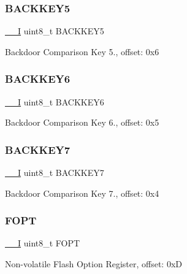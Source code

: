 \subsubsection{\texorpdfstring{BACKKEY5}{BACKKEY5}}
{\footnotesize\ttfamily \mbox{\hyperlink{core__cm0plus_8h_af63697ed9952cc71e1225efe205f6cd3}{\+\_\+\+\_\+I}} uint8\+\_\+t B\+A\+C\+K\+K\+E\+Y5}

Backdoor Comparison Key 5., offset\+: 0x6 \mbox{\label{struct_n_v___type_a3076fe0bf30cde224dfb9c944d517de0}} 
\subsubsection{\texorpdfstring{BACKKEY6}{BACKKEY6}}
{\footnotesize\ttfamily \mbox{\hyperlink{core__cm0plus_8h_af63697ed9952cc71e1225efe205f6cd3}{\+\_\+\+\_\+I}} uint8\+\_\+t B\+A\+C\+K\+K\+E\+Y6}

Backdoor Comparison Key 6., offset\+: 0x5 \mbox{\label{struct_n_v___type_ae3df2dcb7a5f33570f8cc15cc8126810}} 
\subsubsection{\texorpdfstring{BACKKEY7}{BACKKEY7}}
{\footnotesize\ttfamily \mbox{\hyperlink{core__cm0plus_8h_af63697ed9952cc71e1225efe205f6cd3}{\+\_\+\+\_\+I}} uint8\+\_\+t B\+A\+C\+K\+K\+E\+Y7}

Backdoor Comparison Key 7., offset\+: 0x4 \mbox{\label{struct_n_v___type_a4a588e9f6d971bfa0ec727d08935c72e}} 
\subsubsection{\texorpdfstring{FOPT}{FOPT}}
{\footnotesize\ttfamily \mbox{\hyperlink{core__cm0plus_8h_af63697ed9952cc71e1225efe205f6cd3}{\+\_\+\+\_\+I}} uint8\+\_\+t F\+O\+PT}

Non-\/volatile Flash Option Register, offset\+: 0xD \mbox{\label{struct_n_v___type_a060054d1f5f54bb8a55d0eeb7cd8ae29}} 
